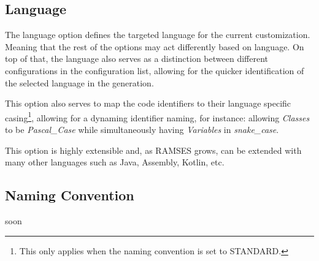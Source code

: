 \subsection{Language}
\label{sec:dsl_lang}

The language option defines the targeted language for the current customization. Meaning that the rest of the options may act differently based on language. On top of that, the language also serves as a distinction between different configurations in the configuration list, allowing for the quicker identification of the selected language in the generation.

This option also serves to map the code identifiers to their language specific casing\footnote{This only applies when the naming convention is set to STANDARD.}, allowing for a dynaming identifier naming, for instance: allowing \textit{Classes} to be \textit{Pascal\_Case} while simultaneously having \textit{Variables} in \textit{snake\_case}.

This option is highly extensible and, as \gls{RAMSES} grows, can be extended with many other languages such as Java, Assembly, Kotlin, etc.

\subsection{Naming Convention}
\label{sec:dsl_name}

soon











